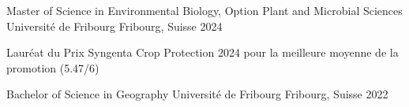 

\begin{cventries}

  \cventry
    {Master of Science in Environmental Biology, Option Plant and Microbial Sciences} %
    {Université de Fribourg} %
    {Fribourg, Suisse} %
    {2024} %
    {
      \begin{cvitems} %
        \item {Lauréat du Prix Syngenta Crop Protection 2024 pour la meilleure moyenne de la promotion (5.47/6)}
      \end{cvitems}
    }

  \cventry
    {Bachelor of Science in Geography} %
    {Université de Fribourg} %
    {Fribourg, Suisse} %
    {2022} %
    {}

\end{cventries}
